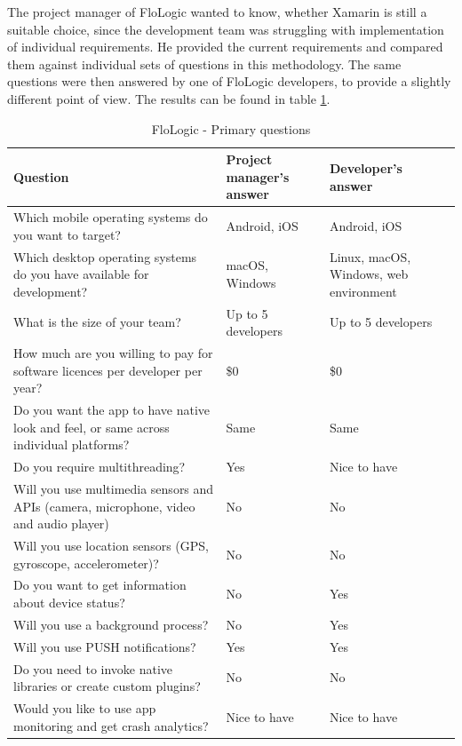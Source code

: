 \documentclass[english,master,public,dept460,male,cpdeclaration,oneside]{diploma}
\begin{document}
The project manager of FloLogic wanted to know, whether Xamarin is still a suitable choice, since the development team was struggling with implementation of individual requirements. He provided the current requirements and compared them against individual sets of questions in this methodology. The same questions were then answered by one of FloLogic developers, to provide a slightly different point of view. The results can be found in table \ref{table:flologicPrimary}.

\begin{table}[!h]
	\centering
	\caption{FloLogic - Primary questions}
	\label{table:flologicPrimary}
	\begin{tabular}{p{5.5cm} | p{3.5cm} | p{3.5cm}}
		\toprule		
		\textbf{Question} &	\textbf{Project manager’s answer} & \textbf{Developer’s answer} \\
		\midrule
		Which mobile operating systems do you want to target? &	Android, iOS & Android, iOS \\
		Which desktop operating systems do you have available for development? & macOS, Windows & Linux, macOS, Windows, web environment \\
		What is the size of your team? & Up to 5 developers & Up to 5 developers \\
		How much are you willing to pay for software licences per developer per year? & \$0 & \$0 \\
		Do you want the app to have native look and feel, or same across individual platforms? & Same & Same \\
		Do you require multithreading? & Yes & Nice to have \\
		Will you use multimedia sensors and APIs (camera, microphone, video and audio player) & No & No \\
		Will you use location sensors (GPS, gyroscope, accelerometer)? & No & No \\
		Do you want to get information about device status? & No & Yes \\
		Will you use a background process? & No & Yes \\
		Will you use PUSH notifications? & Yes & Yes \\
		Do you need to invoke native libraries or create custom plugins? & No & No \\
		Would you like to use app monitoring and get crash analytics? & Nice to have & Nice to have \\		
		\midrule
	\end{tabular}
\end{table}
\end{document}
